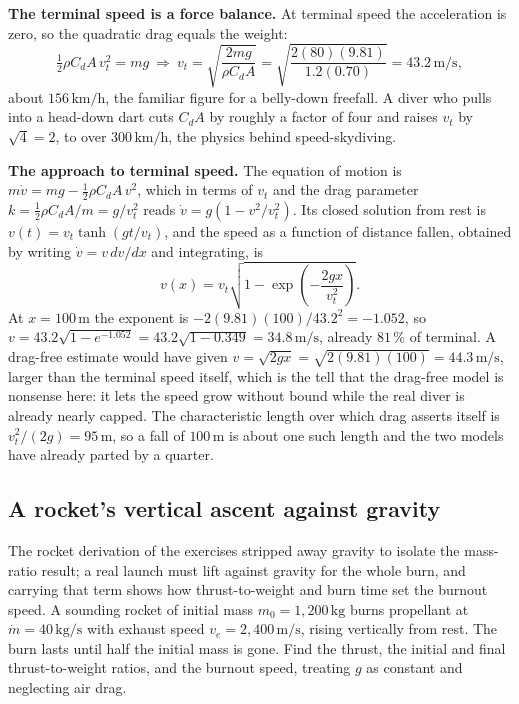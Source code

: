 \textbf{The terminal speed is a force balance.} At terminal speed the
acceleration is zero, so the quadratic drag equals the weight:
\[
\tfrac{1}{2}\rho C_{d}A\,v_{t}^{2}=mg
\ \Rightarrow\
v_{t}=\sqrt{\frac{2mg}{\rho C_{d}A}}=\sqrt{\frac{2(80)(9.81)}{1.2(0.70)}}
=43.2\,\si{\meter\per\second},
\]
about $156\,\si{\kilo\meter\per\hour}$, the familiar figure for a
belly-down freefall. A diver who pulls into a head-down dart cuts
$C_{d}A$ by roughly a factor of four and raises $v_{t}$ by $\sqrt{4}=2$,
to over $300\,\si{\kilo\meter\per\hour}$, the physics behind
speed-skydiving.

\textbf{The approach to terminal speed.} The equation of motion is
$m\dot{v}=mg-\tfrac{1}{2}\rho C_{d}A\,v^{2}$, which in terms of $v_{t}$
and the drag parameter $k=\tfrac{1}{2}\rho C_{d}A/m=g/v_{t}^{2}$ reads
$\dot{v}=g(1-v^{2}/v_{t}^{2})$. Its closed solution from rest is
$v(t)=v_{t}\tanh(gt/v_{t})$, and the speed as a function of distance
fallen, obtained by writing $\dot{v}=v\,dv/dx$ and integrating, is
\[
v(x)=v_{t}\sqrt{1-\exp\!\left(-\frac{2gx}{v_{t}^{2}}\right)}.
\]
At $x=100\,\si{\meter}$ the exponent is $-2(9.81)(100)/43.2^{2}=-1.052$,
so $v=43.2\sqrt{1-e^{-1.052}}=43.2\sqrt{1-0.349}=34.8\,\si{\meter\per
\second}$, already $81\,\%$ of terminal. A drag-free estimate would have
given $v=\sqrt{2gx}=\sqrt{2(9.81)(100)}=44.3\,\si{\meter\per\second}$,
larger than the terminal speed itself, which is the tell that the
drag-free model is nonsense here: it lets the speed grow without bound
while the real diver is already nearly capped. The characteristic length
over which drag asserts itself is $v_{t}^{2}/(2g)=95\,\si{\meter}$, so a
fall of $100\,\si{\meter}$ is about one such length and the two models
have already parted by a quarter.

\subsection{A rocket's vertical ascent against gravity}

The rocket derivation of the exercises stripped away gravity to isolate
the mass-ratio result; a real launch must lift against gravity for the
whole burn, and carrying that term shows how thrust-to-weight and burn
time set the burnout speed. A sounding rocket of initial mass
$m_{0}=1{,}200\,\si{\kilogram}$ burns propellant at $\dot{m}=40\,\si{
\kilogram\per\second}$ with exhaust speed $v_{e}=2{,}400\,\si{\meter\per
\second}$, rising vertically from rest. The burn lasts until half the
initial mass is gone. Find the thrust, the initial and final
thrust-to-weight ratios, and the burnout speed, treating $g$ as constant
and neglecting air drag.

